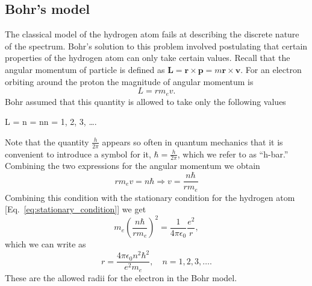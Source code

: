 \subsection{Bohr's model}
The classical model of the hydrogen atom fails at describing the discrete nature of the spectrum.
Bohr's solution to this problem involved postulating that certain properties of the hydrogen atom can only take certain values.
Recall that the angular momentum of particle is defined as $\mathbf{L} = \mathbf{r} \times \mathbf{p} = m \mathbf{r} \times \mathbf{v}$.
For an electron orbiting around the proton the magnitude of angular momentum is
\begin{equation}
L = r m_e v.
\end{equation}
Bohr assumed that this quantity is allowed to take only the following values
\begin{iequation}
L = n  = n\hbar \quad n = 1, 2, 3, \ldots.
\end{iequation}
Note that the quantity $\frac{h}{2\pi}$ appears so often in quantum mechanics that it is convenient to introduce a symbol for it, $\hbar = \frac{h}{2\pi}$, which we refer to as ``h-bar.''
Combining the two expressions for the angular momentum we obtain
\begin{equation}
r m_e v = n\hbar \Rightarrow v = \frac{n\hbar}{r m_e}
\end{equation}
Combining this condition with the stationary condition for the hydrogen atom [Eq.~\eqref{eq:stationary_condition}] we get
\begin{equation}
m_e \left(\frac{n\hbar}{r m_e}\right)^2 = \frac{1}{4 \pi \epsilon_0} \frac{e^2}{r},
\end{equation}
which we can write as
\begin{equation}
r = \frac{4 \pi \epsilon_0 n^2\hbar^2}{e^2 m_e}, \quad n = 1, 2, 3, \ldots .
\end{equation}
These are the allowed radii for the electron in the Bohr model.

